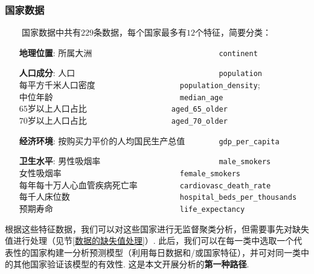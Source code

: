 \documentclass[a4paper, titlepage]{article}
\begin{document}
        \subsubsection*{国家数据}
        　　国家数据中共有$229$条数据，每个国家最多有$12$个特征，简要分类：
        \vspace{5pt}
        \begin{adjustwidth}{1cm}{0cm}
        {\kaishu
        \begin{itemize}[itemsep=-1pt]
            \item [\textbf{地理位置}:]
                所属大洲　　　　　　　　　　　　　　　\texttt{continent}
            \item [\textbf{人口成分}:]
                人口　　　　　　　　　　　　　　　　　\texttt{population}\\ 
                每平方千米人口密度　　　　　　　　　　\texttt{population\_density}; \\
                中位年龄　　　　　　　　　　　　　　　\texttt{median\_age}\\
                $65$岁以上人口占比　　　　　　　　　　\hspace{1.1em}\texttt{aged\_65\_older}\\
                $70$岁以上人口占比　　　　　　　　　　\hspace{1.1em}\texttt{aged\_70\_older}
            \item [\textbf{经济环境}:]
                按购买力平价的人均国民生产总值　　　　\texttt{gdp\_per\_capita}
            \item [\textbf{卫生水平}:]
                男性吸烟率　　　　　　　　　　　　　　\texttt{male\_smokers}\\ 
                女性吸烟率　　　　　　　　　　　　　　\texttt{female\_smokers}\\ 
                每年每十万人心血管疾病死亡率　　　　　\texttt{cardiovasc\_death\_rate}\\ 
                每千人床位数　　　　　　　　　　　　　\texttt{hospital\_beds\_per\_thousands}\\ 
                预期寿命　　　　　　　　　　　　　　　\texttt{life\_expectancy}
        \end{itemize}
        }
        \end{adjustwidth}
        \vspace{5pt}
        根据这些特征数据，我们可以对这些国家进行无监督聚类分析，但需要事先对缺失值进行处理（见节\ref{数据的缺失值处理}）. 此后，我们可以在每一类中选取一个代表性的国家构建一分析预测模型（利用每日数据和/或国家特征），并可对同一类中的其他国家验证该模型的有效性. 这是本文开展分析的\textbf{第一种路径}.
        
\end{document}
